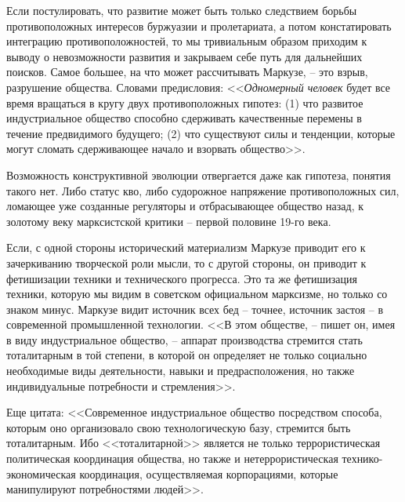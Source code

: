 \documentclass{book}
\begin{document}
Если постулировать, что развитие может быть только следствием борьбы противоположных интересов буржуазии и пролетариата, а потом констатировать интегра­цию противоположностей, то мы тривиальным образом при­ходим к выводу о невозможности развития и закрываем себе путь для дальнейших поисков. Самое большее, на что может рассчитывать Маркузе, -- это взрыв, разрушение общества. Словами предисловия: <<\textit{Одномерный человек}  будет все время вращаться в кругу двух противоположных гипотез: (1) что развитое индустриальное общество способно сдерживать ка­чественные перемены в течение предвидимого будущего; (2) что существуют силы и тенденции, которые могут сломать сдерживающее начало и взорвать общество>>.%

Возможность конструктивной эволюции отвергается даже как гипотеза, по­нятия такого нет. Либо статус кво, либо судорожное напряже­ние противоположных сил, ломающее уже созданные регуля­торы и отбрасывающее общество назад, к золотому веку марк­систской критики -- первой половине 19-го века.

Если, с одной стороны исторический материализм Маркузе приводит его к зачеркиванию творческой роли мысли, то с дру­гой стороны, он приводит к фетишизации техники и техниче­ского прогресса. Это та же фетишизация техники, которую мы видим в советском официальном марксизме, но только со знаком минус. Маркузе видит источник всех бед -- точнее, источник застоя -- в современной промышленной технологии. <<В этом обществе, -- пишет он, имея в виду индустриальное общество, -- аппарат производства стремится стать тоталитар­ным в той степени, в которой он определяет не только соци­ально необходимые виды деятельности, навыки и предрасполо­жения, но также индивидуальные потребности и стремления>>.%

Еще цитата: <<Современное индустриальное общество посред­ством способа, которым оно организовало свою технологиче­скую базу, стремится быть тоталитарным. Ибо <<тоталитарной>> является не только террористическая политическая коорди­нация общества, но также и нетеррористическая технико-эко­номическая координация, осуществляемая корпорациями, кото­рые манипулируют потребностями людей>>.%
\end{document}
